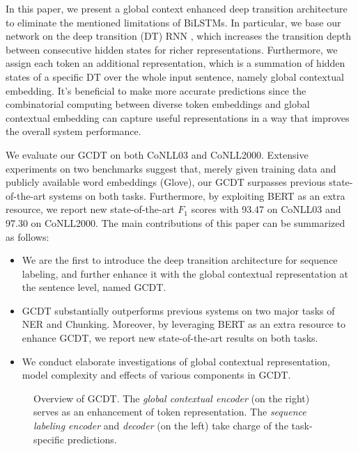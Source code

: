 \documentclass[11pt,a4paper]{article}
\begin{document}
In this paper, we present a global context enhanced deep transition architecture to eliminate the mentioned limitations of BiLSTMs. In particular, we base our network on the deep transition (DT) RNN \cite{DT_language_model},  which increases the transition depth between consecutive hidden states for richer representations. Furthermore, we assign each token an additional representation, which is a summation of hidden states of a specific DT over the whole input sentence, namely global contextual embedding. It's beneficial to make more accurate predictions since the combinatorial computing between diverse token embeddings and global contextual embedding can capture useful representations in a way that improves the overall system performance.

We evaluate our GCDT on both CoNLL03 and CoNLL2000. Extensive experiments on two benchmarks suggest that, merely given training data and publicly available word embeddings (Glove), our GCDT surpasses previous state-of-the-art systems on both tasks. Furthermore, by exploiting BERT as an extra resource, we report new state-of-the-art $F_1$ scores with 93.47 on CoNLL03 and 97.30 on CoNLL2000.
The main contributions of this paper can be summarized as follows:
\begin{itemize}
\item We are the first to introduce the deep transition architecture for sequence labeling, and further enhance it with the global contextual representation at the sentence level, named GCDT.

\item GCDT substantially outperforms previous systems on two major tasks of NER and Chunking. Moreover, by leveraging BERT as an extra resource to enhance GCDT, we report new state-of-the-art results on both tasks. 

\item We conduct elaborate investigations of global contextual representation, model complexity and effects of various components in GCDT.
\end{itemize}

\begin{figure*}[t!]
\begin{center}
      \caption{Overview of GCDT. The \emph{global contextual encoder} (on the right) serves as an enhancement of token representation. The \emph{sequence labeling encoder} and \emph{decoder} (on the left) take charge of the task-specific predictions. } \label{overview}  \vspace{-2pt}
 \end{center} \vspace{-2pt}
\end{figure*}
\end{document}
